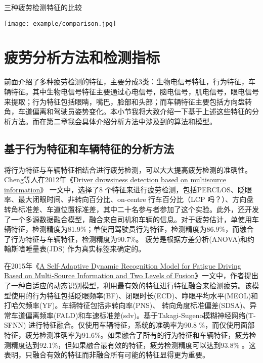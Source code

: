 \begin{table}[!htp]

\centering
\caption{三种疲劳检测特征的比较}
\texttt{[image: example/comparison.jpg]}
\label{table:1-4}

\end{table}

\section{疲劳分析方法和检测指标}

前面介绍了多种疲劳检测的特征，主要分成3类：生物电信号特征，行为特征，车辆特征。其中生物电信号特征主要通过心电信号，脑电信号，肌电信号，眼电信号来提取；行为特征包括眼睛，嘴巴，脸部和头部；而车辆特征主要包括方向盘转角，车道偏离和驾驶员姿势变化。本小节我将大致介绍一下基于上述这些特征的分析方法。而在第二章我会具体介绍分析方法中涉及到的算法和模型。

\subsection{基于行为特征和车辆特征的分析方法}

将行为特征与车辆特征相结合进行疲劳检测，可以大大提高疲劳检测的准确性。Cheng等人在2012年《\href{https://xueshu.baidu.com/usercenter/paper/show?paperid=40e6cefe0fa8b0e382379eef9d105952&site=xueshu_se}{Driver
drowsiness detection based on multisource information}》 一文中，选择了8 个特征来进行疲劳检测，包括PERCLOS、眨眼率、最大闭眼时间、非转向百分比、on-centre 行车百分比（LCP 吗？）、方向盘转角标准差、车道位置标准差，其中二十名参与者参加了这个实验。此外，还开发了一个多源数据融合模型，融合来自司机和车辆的信息。对于疲劳估计，单使用车辆特征，检测精度为81.9$\%$；单使用驾驶员行为特征，检测精度为86.9$\%$，而融合了行为特征与车辆特征，检测精度为90.7$\%$。 疲劳是根据方差分析(ANOVA)和约翰斯嗜睡量表(JDS) 作为真实标签来确定的。

在2015年《\href{https://xueshu.baidu.com/usercenter/paper/show?paperid=50ad15f8eb9411555a57acd85d167dff&site=xueshu_se&hitarticle=1}{A Self-Adaptive Dynamic Recognition Model for Fatigue Driving Based on Multi-Source Information and Two Levels of Fusion}》一文中，作者提出了一种自适应的动态识别模型，利用最有效的特征进行特征融合来检测疲劳。该模型使用的行为特征包括眨眼频率(BF)、闭眼时长(ECD)、睁眼平均水平(MEOL)和打哈欠频率(YF)。车辆特征包括非转向率(PNS)、 转向角度标准偏差(SDSA)、异常车道偏离频率(FALD)和车速标准差(sdv)。基于Takagi-Sugeno模糊神经网络(T-SFNN) 进行特征融合。仅使用车辆特征，系统的准确率为90.8 $\%$，而仅使用面部特征，疲劳检测准确率为91.6$\%$。如果融合了所有的行为特征和车辆特征，疲劳检测精度达到92.1$\%$，但如果融合最有效的特征，疲劳检测精度可以达到93.8$\%$ 。这表明，只融合有效的特征而非融合所有可能的特征显得更为重要。

